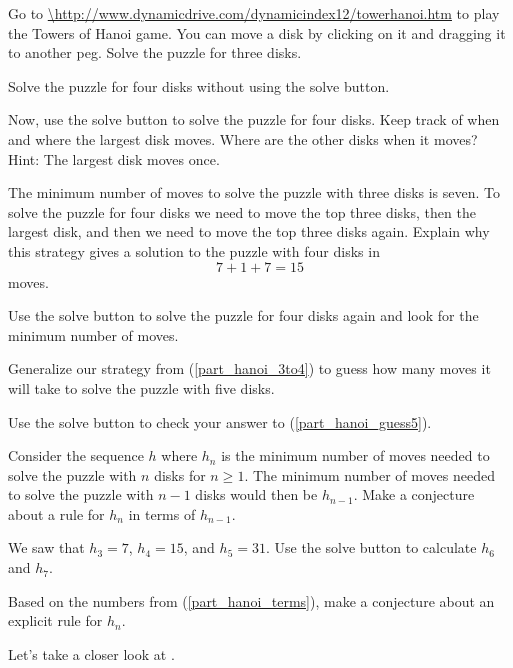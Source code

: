 \begin{act}
        \begin{actpart}
            \item \label{part_hanoi3} Go to \url{\http://www.dynamicdrive.com/dynamicindex12/towerhanoi.htm} to play the Towers of Hanoi game. You can move a disk by clicking on it and dragging it to another peg.  Solve the puzzle for three disks.
            \item Solve the puzzle for four disks without using the solve button.
            \item Now, use the solve button to solve the puzzle for four disks.  Keep track of when and where the largest disk moves.  Where are the other disks when it moves? Hint: The largest disk moves once.  
            \item \label{part_hanoi_3to4} The minimum number of moves to solve the puzzle with three disks is seven. To solve the puzzle for four disks we need to move the top three disks, then the largest disk, and then we need to move the top three disks again.  Explain why this strategy gives a solution to the puzzle with four disks in $$7+1+7=15$$ moves.
            \item Use the solve button to solve the puzzle for four disks again and look for the minimum number of moves. 
            \item \label{part_hanoi_guess5} Generalize our strategy from (\ref{part_hanoi_3to4}) to guess how many moves it will take to solve the puzzle with five disks.
            \item Use the solve button to check your answer to (\ref{part_hanoi_guess5}).
            \item Consider the sequence $h$ where $h_n$ is the minimum number of moves needed to solve the puzzle with $n$ disks for $n \ge 1$.  The minimum number of moves needed to solve the puzzle with $n-1$ disks would then be $h_{n-1}$.  Make a conjecture about a rule for $h_n$ in terms of $h_{n-1}$.
            \item \label{part_hanoi_terms} We saw that $h_3=7$, $h_4=15$, and $h_5=31$.  Use the solve button to calculate $h_6$ and $h_7$.  
            \item Based on the numbers from (\ref{part_hanoi_terms}), make a conjecture about an explicit rule for $h_n$.
        \end{actpart}
\end{act}

Let's take a closer look at .  

